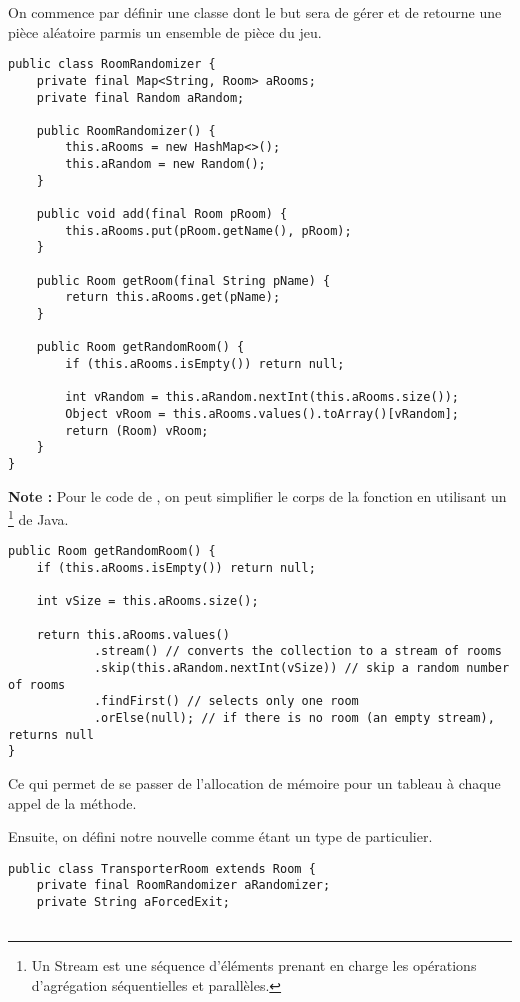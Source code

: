 \begin{exercise}[subtitle=Transporter]

On commence par définir une classe  dont le but sera de gérer et de retourne une pièce aléatoire parmis un ensemble de pièce du jeu.

\begin{verbatim}
public class RoomRandomizer {
    private final Map<String, Room> aRooms;
    private final Random aRandom;

    public RoomRandomizer() {
        this.aRooms = new HashMap<>();
        this.aRandom = new Random();
    }

    public void add(final Room pRoom) {
        this.aRooms.put(pRoom.getName(), pRoom);
    }

    public Room getRoom(final String pName) {
        return this.aRooms.get(pName);
    }

    public Room getRandomRoom() {
        if (this.aRooms.isEmpty()) return null;

        int vRandom = this.aRandom.nextInt(this.aRooms.size());
        Object vRoom = this.aRooms.values().toArray()[vRandom];
        return (Room) vRoom;
    }
}
\end{verbatim}

\textbf{Note :} Pour le code de , on peut simplifier le corps de la fonction en utilisant un \footnote{Un Stream est une séquence d'éléments prenant en charge les opérations d'agrégation séquentielles et parallèles.} de Java.

\begin{verbatim}
public Room getRandomRoom() {
    if (this.aRooms.isEmpty()) return null;

    int vSize = this.aRooms.size();

    return this.aRooms.values()
            .stream() // converts the collection to a stream of rooms
            .skip(this.aRandom.nextInt(vSize)) // skip a random number of rooms
            .findFirst() // selects only one room
            .orElse(null); // if there is no room (an empty stream), returns null
}
\end{verbatim}

Ce qui permet de se passer de l'allocation de mémoire pour un tableau à chaque appel de la méthode.

Ensuite, on défini notre nouvelle  comme étant un type de  particulier.

\begin{verbatim}
public class TransporterRoom extends Room {
    private final RoomRandomizer aRandomizer;
    private String aForcedExit;


\end{verbatim}
\end{exercise}
